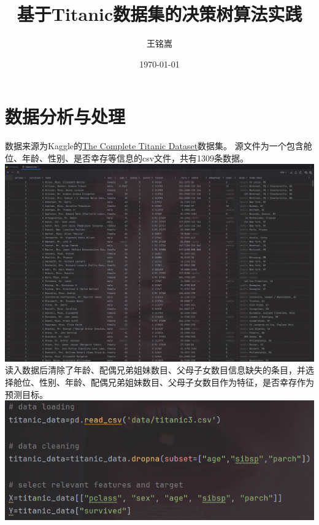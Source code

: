 \documentclass{article}
\title{基于Titanic数据集的决策树算法实践}
\author{王铭嵩}
\date{\today}
\begin{document}
\maketitle
\newpage
\section{数据分析与处理}
数据来源为Kaggle的\href{'https://www.kaggle.com/datasets/vinicius150987/titanic3'}{The Complete Titanic Dataset}数据集。
源文件为一个包含舱位、年龄、性别、是否幸存等信息的csv文件，共有1309条数据。\\
\includegraphics[width=1.0\textwidth]{code_screenshot/datasrc.png}\\
读入数据后清除了年龄、配偶兄弟姐妹数目、父母子女数目信息缺失的条目，并选择舱位、性别、年龄、配偶兄弟姐妹数目、父母子女数目作为特征，是否幸存作为预测目标。\\
\includegraphics[width=1.0\textwidth]{code_screenshot/dataclean.png}\\
\end{document}

